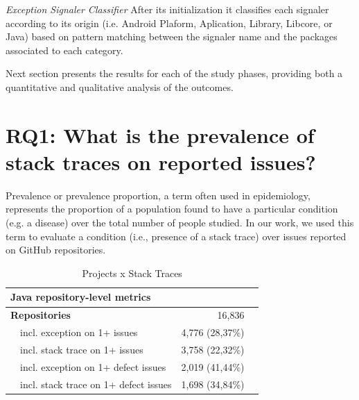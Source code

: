\documentclass[conference]{IEEEtran}
\begin{document}
\noindent\emph{Exception Signaler Classifier} After its initialization it classifies each signaler according to its origin (i.e. Android Plaform, Aplication, Library, Libcore, or Java) based on pattern matching between the signaler name
and the packages associated to each category.

Next section presents the results for each of the study phases, providing both a quantitative and qualitative analysis of the outcomes.


\section{RQ1: What is the prevalence of stack traces on reported issues?}

Prevalence or prevalence proportion, a term often used in epidemiology, represents the proportion of a population found to have a particular condition (e.g. a disease) over the total number of people studied. In our work, we used this term to evaluate a condition (i.e., presence of a stack trace) over issues reported on GitHub repositories. 



\begin{table}
\centering
\begin{tabular}{p{1em}lrr}
\hline
 \multicolumn{2}{l}{\bfseries{Java repository-level metrics}} & \\
\hline
\multicolumn{2}{l}{\bfseries{Repositories}} & 16,836\\
    & incl. exception on 1+ issues & 4,776 (28,37\%) \\
    & incl. stack trace on 1+ issues & 3,758 (22,32\%) \\
    & incl. exception on 1+ defect issues & 2,019 (41,44\%)\\
    & incl. stack trace on 1+ defect issues  & 1,698 (34,84\%) \\
 
\hline
\end{tabular}
\caption{Projects x Stack Traces}
\label{tab:proj}
\end{table}
\end{document}
